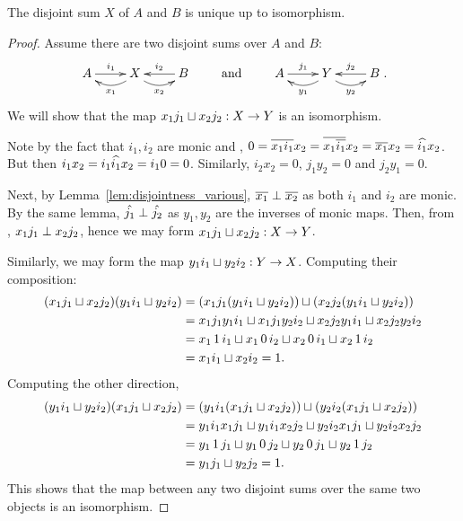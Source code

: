 \begin{lemma}\label{lem:disjoint_sum_is_unique}
  The disjoint sum $X$ of $A$ and $B$ is unique up to isomorphism.
\end{lemma}
\begin{proof}
  Assume there are two disjoint sums over $A$ and $B$:
  \[
    \xymatrix{
      A\ar[r]^{i_1} &X\ar@/^9pt/[l]^{x_1} \ar@/_9pt/[r]_{x_2} & B \ar[l]_{i_2}
    }
    \qquad  \text{ and  }\qquad
    \xymatrix{
      A\ar[r]^{\jay_1} &Y\ar@/^9pt/[l]^{y_1} \ar@/_9pt/[r]_{y_2} & B \ar[l]_{\jay_2}
    }.
  \]
  We will show that the map $x_1 j_1 \sqcup x_2 j_2 : X \to Y$ is an isomorphism.

  Note by the fact that $i_1, i_2$ are monic and ,
  $0 = \overline{x_1 i_1} x_2 = \overline{x_1\overline{i_1}} x_2 = \overline{x_1} x_2 = \widehat{i_1}{x_2}$. But then
  $i_1 x_2 = i_1 \widehat{i_1} x_2 = i_1 0 = 0$. Similarly, $i_2 x_2 = 0$, $j_1 y_2 =0$ and
  $j_2 y_1 = 0$.

  Next, by Lemma~\ref{lem:disjointness_various}, $\overline{x_1}\perp\overline{x_2}$ as both
  $i_1$ and $i_2$ are monic. By the same lemma, $\hat{j_1} \perp \hat{j_2}$ as $y_1, y_2$
  are the inverses of monic maps.  Then, from , $x_1 j_1 \perp x_2 j_2$,
  hence we may form $x_1 j_1 \sqcup x_2 j_2 : X \to Y$.

  Similarly, we may form the map $y_1 i_1 \sqcup y_2 i_2 : Y \to X$. Computing their composition:
  \begin{align*}
    (x_1 j_1 \sqcup x_2 j_2)(y_1 i_1 \sqcup y_2 i_2)
      &= (x_1 j_1 (y_1 i_1 \sqcup y_2 i_2))\sqcup (x_2 j_2(y_1 i_1 \sqcup y_2 i_2))\\
      &= x_1 j_1 y_1 i_1 \sqcup x_1 j_1 y_2 i_2 \sqcup x_2 j_2 y_1 i_1 \sqcup x_2
        j_2 y_2 i_2 \\
      &= x_1\, 1\, i_1 \sqcup x_1\, 0\, i_2 \sqcup x_2\, 0\, i_1 \sqcup x_2\, 1\, i_2\\
      &= x_1 i_1 \sqcup x_2 i_2 = 1.
  \end{align*}
  Computing the other direction,
  \begin{align*}
    (y_1 i_1 \sqcup y_2 i_2)(x_1 j_1 \sqcup x_2 j_2)
      &= (y_1 i_1 (x_1 j_1 \sqcup x_2 j_2) )\sqcup (y_2 i_2(x_1 j_1 \sqcup x_2 j_2))\\
      &= y_1 i_1 x_1 j_1 \sqcup y_1 i_1 x_2 j_2 \sqcup y_2 i_2 x_1 j_1
        \sqcup y_2 i_2 x_2 j_2\\
      &= y_1\, 1\, j_1 \sqcup y_1\, 0\, j_2 \sqcup y_2\, 0\, j_1 \sqcup y_2\, 1\, j_2\\
      &= y_1 j_1 \sqcup y_2 j_2 = 1.\\
  \end{align*}
  This shows that the map between any two disjoint sums over the same two objects is an isomorphism.
\end{proof}


